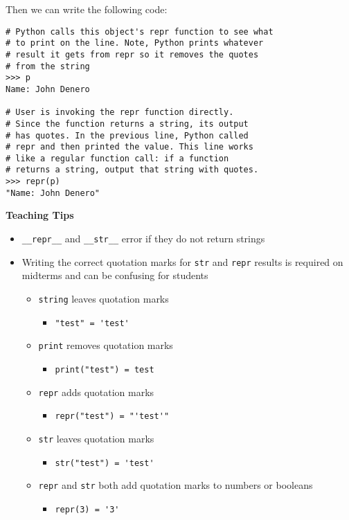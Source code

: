 Then we can write the following code:
\vspace{.25cm}
\begin{lstlisting}
# Python calls this object's repr function to see what
# to print on the line. Note, Python prints whatever
# result it gets from repr so it removes the quotes
# from the string
>>> p
Name: John Denero

# User is invoking the repr function directly.
# Since the function returns a string, its output
# has quotes. In the previous line, Python called
# repr and then printed the value. This line works
# like a regular function call: if a function
# returns a string, output that string with quotes.
>>> repr(p)
"Name: John Denero"
\end{lstlisting}
\vspace{.25cm}

\begin{blocksection}
\begin{guide}
\textbf{Teaching Tips}
\begin{itemize}
\item \lstinline{__repr__} and \lstinline{__str__} error if they do not return strings
\item Writing the correct quotation marks for \lstinline{str} and \lstinline{repr} results is required on midterms and can be confusing for students
\begin{itemize}
  \item \lstinline{string} leaves quotation marks
  \begin{itemize}
    \item \lstinline{"test" = 'test'}
  \end{itemize}
  \item \lstinline{print} removes quotation marks
  \begin{itemize}
    \item \lstinline{print("test") = test}
  \end{itemize}
  \item \lstinline{repr} adds quotation marks
  \begin{itemize}
    \item \lstinline{repr("test") = "'test'"}
  \end{itemize}
  \item \lstinline{str} leaves quotation marks
  \begin{itemize}
    \item \lstinline{str("test") = 'test'}
  \end{itemize}
  \item \lstinline{repr} and \lstinline{str} both add quotation marks to numbers or booleans
  \begin{itemize}
    \item \lstinline{repr(3) = '3'}
  \end{itemize}
\end{itemize}
\end{itemize}
\end{guide}
\end{blocksection}
